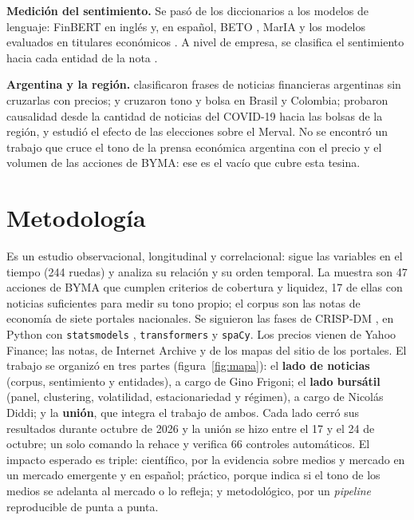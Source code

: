 \textbf{Medición del sentimiento.} Se pasó de los diccionarios \citep{loughran2011} a los modelos
de lenguaje: FinBERT en inglés \citep{araci2019finbert} y, en español, BETO
\citep{canete2020beto}, MarIA \citep{gutierrez2022maria} y los modelos evaluados en titulares
económicos \citep{pan2023peerj}. A nivel de empresa, se clasifica el
sentimiento hacia cada entidad de la nota \citep{tang2023finentity}.

\textbf{Argentina y la región.} \citet{brana2016} clasificaron frases de noticias financieras
argentinas sin cruzarlas con precios; \citet{galdi2018} y \citet{cruzmontana2025} cruzaron tono y
bolsa en Brasil y Colombia; \citet{coronado2022} probaron causalidad desde la cantidad de noticias
del COVID-19 hacia las bolsas de la región, y \citet{calandroni2026} estudió el efecto de las
elecciones sobre el Merval. No se encontró un trabajo que cruce el tono de la prensa económica
argentina con el precio y el volumen de las acciones de BYMA: ese es el vacío que cubre esta
tesina.

\section{Metodología}
\label{sec:metodologia}

Es un estudio observacional, longitudinal y correlacional: sigue las variables en el tiempo (244
ruedas) y analiza su relación y su orden temporal. La muestra son 47 acciones de BYMA que cumplen
criterios de cobertura y liquidez, 17 de ellas con noticias suficientes para medir su tono
propio; el corpus son las notas de economía de siete portales nacionales. Se siguieron las fases
de CRISP-DM \citep{wirth2000crispdm}, en Python con \texttt{statsmodels} \citep{seabold2010},
\texttt{transformers} y \texttt{spaCy}. Los precios vienen de Yahoo Finance; las notas, de
Internet Archive y de los mapas del sitio de los portales. El trabajo se organizó en tres partes
(figura~\ref{fig:mapa}): el \textbf{lado de noticias} (corpus, sentimiento y entidades), a cargo
de Gino Frigoni; el \textbf{lado bursátil} (panel, clustering, volatilidad, estacionariedad y
régimen), a cargo de Nicolás Diddi; y la \textbf{unión}, que integra el trabajo de ambos. Cada
lado cerró sus resultados durante octubre de 2026 y la unión se hizo entre el 17 y el 24 de
octubre; un solo comando la rehace y verifica 66 controles automáticos. El impacto esperado es
triple: científico, por la evidencia sobre medios y mercado en un mercado emergente y en español;
práctico, porque indica si el tono de los medios se adelanta al mercado o lo refleja; y
metodológico, por un \textit{pipeline} reproducible de punta a punta.

